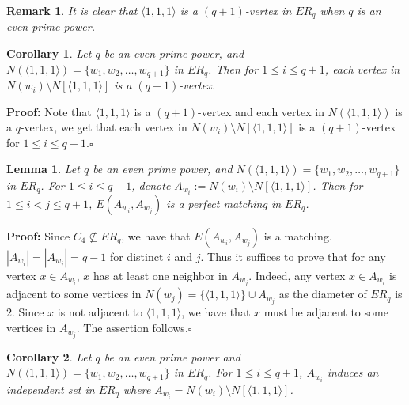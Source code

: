 \documentclass[12pt]{article}
\newtheorem{lemma}{Lemma}
\newtheorem{corollary}{Corollary}
\newtheorem{remark}{Remark}
\begin{document}
	
	\begin{remark}
		It is clear that $\langle 1,1,1\rangle$ is a $(q + 1)$-vertex in $ER_q$ when $q$ is an even prime power.
	\end{remark}
	
	\begin{corollary}
		Let $q$ be an even prime power, and $N(\langle 1,1,1\rangle ) = \{w_1,w_2,\dots,w_{q+1}\}$ in $ER_q$. Then for $1 \leq i \leq q + 1$, each vertex in $N(w_i) \setminus N[\langle 1,1,1\rangle]$ is a $(q + 1)$-vertex.
	\end{corollary}
	{\bf Proof:}
			Note that $\langle 1,1,1\rangle$ is a $(q + 1)$-vertex and each vertex in $N(\langle 1,1,1\rangle)$ is a $q$-vertex, we get that each vertex in $N(w_i) \setminus N[\langle 1,1,1\rangle]$ is a $(q + 1)$-vertex for $1 \leq i \leq q + 1$.\hfill$\square$

	
	\begin{lemma}
		Let $q$ be an even prime power, and $N(\langle 1,1,1\rangle) = \{w_1,w_2,\dots,w_{q+1}\}$ in $ER_q$. For $1 \leq i \leq q + 1$, denote $A_{w_i} := N(w_i) \setminus N[\langle 1,1,1\rangle]$. Then for $1 \leq i < j \leq q + 1$, $E(A_{w_i},A_{w_j})$ is a perfect matching in $ER_q$.
	\end{lemma}
	{\bf Proof:}
			Since $C_4 \nsubseteq ER_q$, we have that $E(A_{w_i},A_{w_j})$ is a matching. $|A_{w_i}| = |A_{w_j}| = q - 1$ for distinct $i$ and $j$. Thus it suffices to prove that for any vertex $x \in A_{w_i}$, $x$ has at least one neighbor in $A_{w_j}$. Indeed, any vertex $x \in A_{w_i}$ is adjacent to some vertices in $N(w_j)=\{\langle 1,1,1\rangle\} \cup A_{w_j}$ as the diameter of $ER_q$ is $2$. Since $x$ is not adjacent to $\langle 1,1,1\rangle$, we have that $x$ must be adjacent to some vertices in $A_{w_j}$. The assertion follows.\hfill$\square$
	
	
	\begin{corollary}
		 Let $q$ be an even prime power and $N(\langle 1,1,1\rangle) = \{w_1,w_2,\dots,w_{q+1}\}$ in $ER_q$. For $1 \leq i \leq q + 1$, $A_{w_i}$ induces an independent set in $ER_q$ where $A_{w_i} = N(w_i) \setminus N[\langle 1,1,1\rangle]$.
	\end{corollary}
\end{document}
